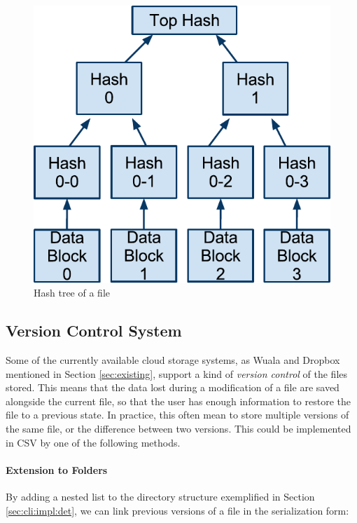 \documentclass[pdftex,english,10pt,b5paper,twoside]{book}
\begin{document}
\begin{figure}[!h]
\centering
\includegraphics[scale=0.55]{hash-tree.pdf}
\caption{Hash tree of a file}
\label{fig:hashtree}
\end{figure}

\subsection{Version Control System}

Some of the currently available cloud storage systems, as Wuala and Dropbox
mentioned in Section \ref{sec:existing}, support a kind of \emph{version
control} of the files stored. This means that the data lost during a
modification of a file are saved alongside the current file, so that the user
has enough information to restore the file to a previous state.  In practice,
this often mean to store multiple versions of the same file, or the difference
between two versions. This could be implemented in \ac{CSV} by one of the
following methods.

\paragraph{Extension to Folders} By adding a nested list to the directory
structure exemplified in Section \ref{sec:cli:impl:det}, we can link previous
versions of a file in the serialization form:
\end{document}
